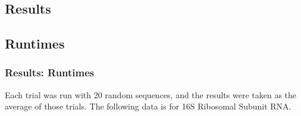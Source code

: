 \documentclass{beamer}
\begin{document}
\begin{frame}
\section{Results}
\subsection{Runtimes}
\frametitle{Results: Runtimes} 
Each trial was run with 20 random sequences, and the results were taken as the average of those trials. 
The following data is for 16S Ribosomal Subunit RNA. 
\begin{figure}
\centering
{}
\end{figure}
\end{frame}
\end{document}
